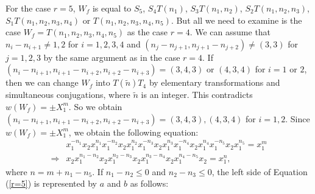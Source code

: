 \documentclass{amsart}
\theoremstyle{plain}
\theoremstyle{definition}
\begin{document}
For the case $r=5$, $W_f$ is equal to $S_5$, $S_4T(n_1)$, $S_3T(n_1,n_2)$, $S_2T(n_1,n_2,n_3)$, $S_1T(n_1,n_2,n_3,n_4)$ or $T(n_1,n_2,n_3,n_4,n_5)$. 
But all we need to examine is the case $W_f=T(n_1,n_2,n_3,n_4,n_5)$ as the case $r=4$. 
We can assume that $n_i-n_{i+1}\neq 1,2$ for $i=1,2,3,4$ and $(n_j-n_{j+1},n_{j+1}-n_{j+2})\neq(3,3)$ for $j=1,2,3$ by the same argument as in the case $r=4$. 
If $(n_i-n_{i+1},n_{i+1}-n_{i+2},n_{i+2}-n_{i+3})=(3,4,3)$ or $(4,3,4)$ for $i=1$ or $2$, then we can change $W_f$ into $T(\tilde{n})T_4$ by elementary transformations and simultaneous conjugations, where $\tilde{n}$ is an integer. 
This contradicts $w(W_f)=\pm X_1^m$. 
So we obtain $(n_i-n_{i+1},n_{i+1}-n_{i+2},n_{i+2}-n_{i+3})=(3,4,3), (4,3,4)$ for $i=1,2$. 
Since $w(W_f)=\pm X_1^m$, we obtain the following equation: 
{\allowdisplaybreaks
\begin{align}
\label{r=5}
& x_1^{-n_1}x_2x_1^{n_1}x_1^{-n_2}x_2x_1^{n_2}x_1^{-n_3}x_2x_1^{n_3}x_1^{-n_4}x_2x_1^{n_4}x_1^{-n_5}x_2x_1^{n_5}=x_1^m \nonumber \\
\Rightarrow & x_2x_1^{n_1-n_2}x_2x_1^{n_2-n_3}x_2x_1^{n_3-n_4}x_2x_1^{n_4-n_5}x_2=x_1^n, 
\end{align}
}
where $n=m+n_1-n_5$. 
If $n_1-n_2\leq 0$ and $n_2-n_3\leq 0$, the left side of Equation (\ref{r=5}) is represented by $a$ and $b$ as follows: 
\end{document}
